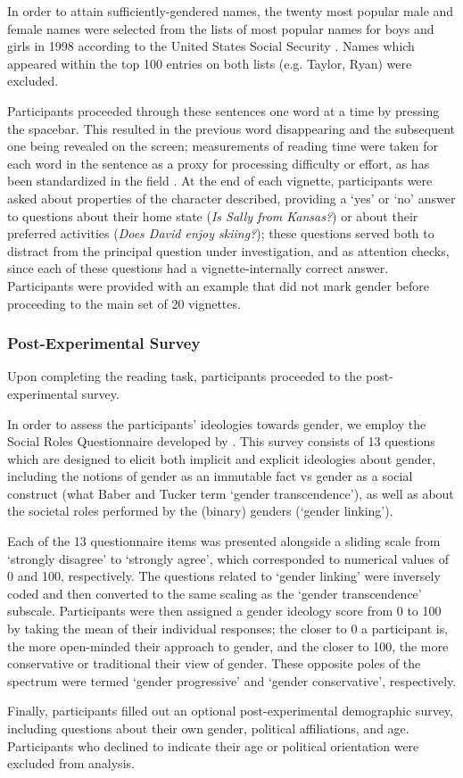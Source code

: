 \documentclass[10pt,letterpaper]{article}
\begin{document}
	  In order to attain sufficiently-gendered names, the twenty most popular male and female names were selected from the lists of most popular names for boys and girls in 1998 according to the United States Social Security \textcite{socialsecurity}. Names which appeared within the top 100 entries on both lists (e.g. Taylor, Ryan) were excluded. \par 
	  Participants proceeded through these sentences one word at a time by pressing the spacebar. This resulted in the previous word disappearing and the subsequent one being revealed on the screen; measurements of reading time were taken for each word in the sentence as a proxy for processing difficulty or effort, as has been standardized in the field \parencite{forster2009maze}. At the end of each vignette, participants were asked about properties of the character described, providing a `yes' or `no' answer to questions about their home state (\textit{Is Sally from Kansas?}) or about their preferred activities (\textit{Does David enjoy skiing?}); these questions served both to distract from the principal question under investigation, and as attention checks, since each of these questions had a vignette-internally correct answer. Participants were provided with an example that did not mark gender before proceeding to the main set of 20 vignettes. 
	  
	\subsubsection{Post-Experimental Survey} 
	Upon completing the reading task, participants proceeded to the post-experimental survey. \par 
	In order to assess the participants' ideologies towards gender, we employ the Social Roles Questionnaire developed by \textcite{baber2006social}. This survey consists of 13 questions which are designed to elicit both implicit and explicit ideologies about gender, including the notions of gender as an immutable fact vs gender as a social construct (what Baber and Tucker term `gender transcendence'), as well as about the societal roles performed by the (binary) genders (`gender linking').\par 
	Each of the 13 questionnaire items was presented alongside a sliding scale from `strongly disagree' to `strongly agree', which corresponded to numerical values of 0 and 100, respectively. The questions related to `gender linking' were inversely coded and then converted to the same scaling as the `gender transcendence' subscale. Participants were then assigned a gender ideology score from 0 to 100 by taking the mean of their individual responses; the closer to 0 a participant is, the more open-minded their approach to gender, and the closer to 100, the more conservative or traditional their view of gender. These opposite poles of the spectrum were termed `gender progressive' and `gender conservative', respectively.\par 
	Finally, participants filled out an optional post-experimental demographic survey, including questions about their own gender, political affiliations, and age. Participants who declined to indicate their age or political orientation were excluded from analysis.
	
\end{document}
